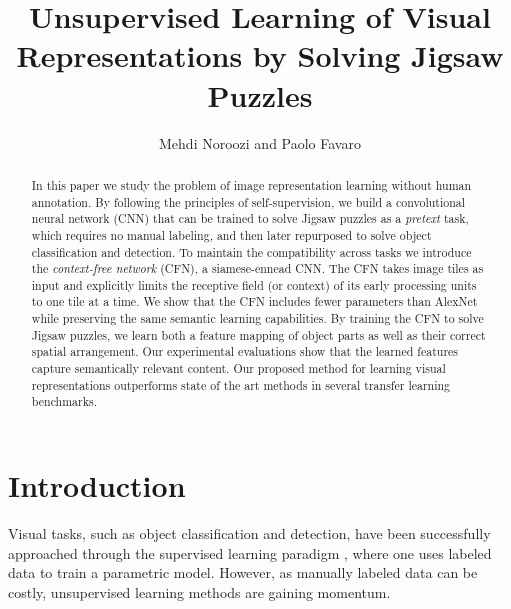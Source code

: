 \documentclass[runningheads]{llncs}
\begin{document}
\mainmatter

\newcommand\eg{{\emph{e.g.}}}
\newcommand\ie{{\emph{i.e.}}}
\newcommand\etal{{\emph{et al. }}}

\title{Unsupervised Learning of Visual Representations by Solving Jigsaw Puzzles}



\author{Mehdi Noroozi and Paolo Favaro }

\maketitle

\begin{abstract} 
In this paper we study the problem of image representation learning without human annotation. By following the principles of self-supervision, we build a convolutional neural network (CNN) that can be trained to solve Jigsaw puzzles as a \emph{pretext} task, which requires no manual labeling, and then later repurposed to solve object classification and detection. To maintain the compatibility across tasks we introduce the \emph{context-free network} (CFN), a siamese-ennead CNN. The CFN takes image tiles as input and explicitly limits the receptive field (or context) of its early processing units to one tile at a time. We show that the CFN includes fewer parameters than AlexNet while preserving the same semantic learning capabilities. By training the CFN to solve Jigsaw puzzles, we learn both a feature mapping of object parts as well as their correct spatial arrangement. Our experimental evaluations show that the learned features capture semantically relevant content. Our proposed method for learning visual representations outperforms state of the art methods in several transfer learning benchmarks.
\end{abstract}

\section{Introduction}

Visual tasks, such as object classification and detection, have been successfully approached through the supervised learning paradigm \cite{agrawalGM14,donahueJVHZTD13,KrizhevskyIH12,simonyanZ14}, where one uses labeled data to train a parametric model. However, as manually labeled data can be costly, unsupervised learning methods are gaining momentum.
\end{document}

